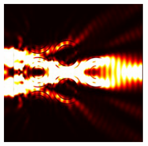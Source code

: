 		\begin{figure}
				\includegraphics[width=\textwidth]{images/multilayer/konc_coreshell_energy.png}\\
		\end{figure}
